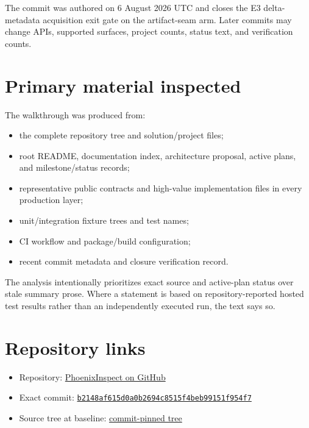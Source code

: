 \documentclass[11pt,oneside,openany]{book}
\newcommand{\commit}{\texttt{b2148af615d0a0b2694c8515f4beb99151f954f7}}
\begin{document}
The commit was authored on 6 August 2026 UTC and closes the E3 delta-metadata acquisition exit gate on the artifact-seam arm. Later commits may change APIs, supported surfaces, project counts, status text, and verification counts.

\section{Primary material inspected}

The walkthrough was produced from:

\begin{itemize}
  \item the complete repository tree and solution/project files;
  \item root README, documentation index, architecture proposal, active plans, and milestone/status records;
  \item representative public contracts and high-value implementation files in every production layer;
  \item unit/integration fixture trees and test names;
  \item CI workflow and package/build configuration;
  \item recent commit metadata and closure verification record.
\end{itemize}

The analysis intentionally prioritizes exact source and active-plan status over stale summary prose. Where a statement is based on repository-reported hosted test results rather than an independently executed run, the text says so.

\section{Repository links}

\begin{itemize}
  \item Repository: \href{https://github.com/VladimirReshetnikov/PhoenixInspect}{PhoenixInspect on GitHub}
  \item Exact commit: \href{https://github.com/VladimirReshetnikov/PhoenixInspect/commit/b2148af615d0a0b2694c8515f4beb99151f954f7}{\commit}
  \item Source tree at baseline: \href{https://github.com/VladimirReshetnikov/PhoenixInspect/tree/b2148af615d0a0b2694c8515f4beb99151f954f7}{commit-pinned tree}
\end{itemize}
\end{document}
